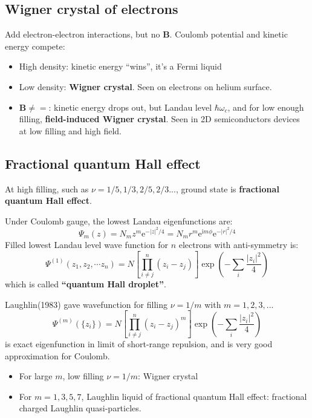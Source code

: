 \documentclass[11pt,letterpaper]{article}
\numberwithin{equation}{section} %
\renewcommand*{\vec}[1]{\bm{#1}}
\newcommand\mi{\mathrm{i}}
\newcommand\e{\mathrm{e}}
\begin{document}
\subsection{Wigner crystal of electrons}
\label{sub:wigner_crystal_of_electrons}
Add electron-electron interactions, but no $\vec B$. Coulomb potential and
kinetic energy compete: 
\begin{itemize}
  \item High density: kinetic energy ``wins'', it's a Fermi liquid
  \item Low density: \textbf{Wigner crystal}. Seen on electrons on helium
	  surface. 
  \item $\vec B\neq =$: kinetic energy drops out, but Landau level
	  $\hbar\omega_c$, and for low enough filling, \textbf{field-induced
	  Wigner crystal}. Seen in 2D semiconductors devices at low filling and
	  high field.
\end{itemize}

\subsection{Fractional quantum Hall effect}
\label{sub:fractional_quantum_hall_effect}
At high filling, such as $\nu = 1/5, 1/3, 2/5, 2/3...$, ground state is
\textbf{fractional quantum Hall effect}.

Under Coulomb gauge, the lowest Landau eigenfunctions are: 
\begin{equation}
	\Psi_m(z) = N_m z^m\e^{-|z|^2/4} = N_m r^m \e^{\mi m\phi}\e^{-|r|^2/4}
\end{equation}
Filled lowest Landau level wave function for $n$ electrons with anti-symmetry is: 
\begin{equation}
	\Psi^{(1)}(z_1, z_2, \cdots z_n) = N \left[ \prod_{i\neq j}^n (z_i-z_j)
	\right]\exp \left(-\sum_i \frac{|z_i|^2}{4}\right)
\end{equation}
which is called \textbf{``quantum Hall droplet''}. 

Laughlin(1983) gave wavefunction for filling $\nu=1/m$ with $m=1,2,3,...$
\begin{equation}
	\Psi^{(m)}(\{z_i\}) =  N \left[ \prod_{i\neq j}^n (z_i-z_j)^m
	\right]\exp \left(-\sum_i \frac{|z_i|^2}{4}\right)
\end{equation}
is exact eigenfunction in limit of short-range repulsion, and is very good
approximation for Coulomb.
\begin{itemize}
  \item For large $m$, low filling $\nu = 1/m$: Wigner crystal
  \item For $m=1,3,5,7$, Laughlin liquid of fractional quantum Hall effect:
	  fractional charged Laughlin quasi-particles. 
\end{itemize}
\end{document}
